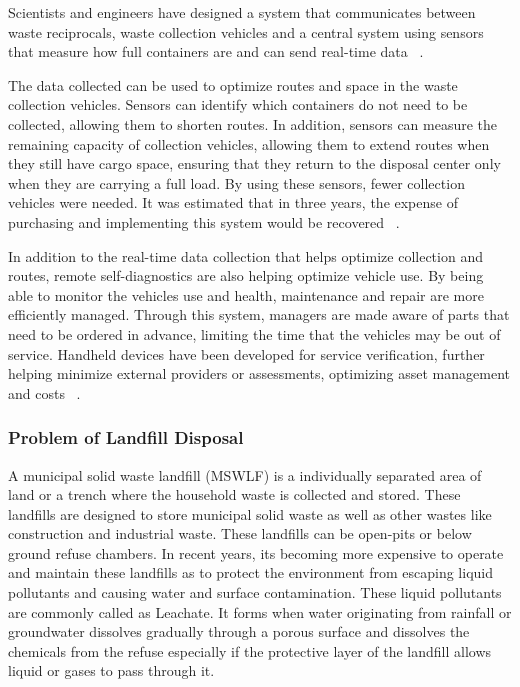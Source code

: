 \documentclass[sigconf]{acmart}
\begin{document}
Scientists and engineers have designed a system that communicates between waste reciprocals, waste collection vehicles and a central system using sensors that measure how full containers are and can send real-time data ~\cite{faccio2011}.

The data collected can be used to optimize routes and space in the waste collection vehicles.  Sensors can identify which containers do not need to be collected, allowing them to shorten routes.  In addition, sensors can measure the remaining capacity of collection vehicles, allowing them to extend routes when they still have cargo space, ensuring that they return to the disposal center only when they are carrying a full load.  By using these sensors, fewer collection vehicles were needed.  It was estimated that in three years, the expense of purchasing and implementing this system would be recovered ~\cite{shahrokni2014big}.

In addition to the real-time data collection that helps optimize collection and routes, remote self-diagnostics are also helping optimize vehicle use.  By being able to monitor the vehicles use and health, maintenance and repair are more efficiently managed.  Through this system, managers are made aware of parts that need to be ordered in advance, limiting the time that the vehicles may be out of service.  Handheld devices have been developed for service verification, further helping minimize external providers or assessments, optimizing asset management and costs ~\cite{megan2017}.


\subsubsection{Problem of Landfill Disposal}

A municipal solid waste landfill (MSWLF) is a individually separated area of land or a trench where the household waste is collected and stored. These landfills are designed to store municipal solid waste as well as other wastes like construction and industrial waste. These landfills can be open-pits or below ground refuse chambers. In recent years, its becoming more expensive to operate and maintain these landfills as to protect the environment from escaping liquid pollutants and causing water and surface contamination. These liquid pollutants are commonly called as Leachate. It forms when water originating from rainfall or groundwater dissolves gradually through a porous surface and dissolves the chemicals from the refuse especially if the protective layer of the landfill allows liquid or gases to pass through it. 
\end{document}
